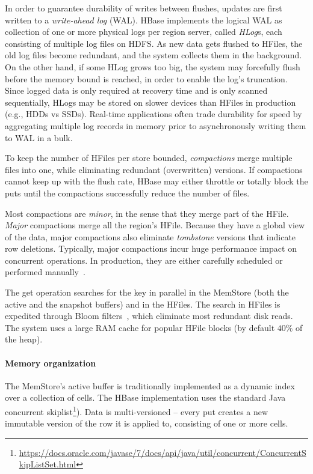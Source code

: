 In order to guarantee durability of writes between flushes, updates are first written to 
a \emph{write-ahead log} (WAL). HBase implements the logical WAL as collection of one or more physical 
logs per region server, called \emph{HLog}s, each consisting of multiple log files on HDFS. 
As new data gets flushed to HFiles, the old log files become redundant, and the system collects 
them in the background. On the other hand, if some HLog grows too big, the system may forcefully
flush before the memory bound is reached, in order to enable the log's truncation. 
Since logged data is only required at recovery time and is only scanned sequentially, HLogs
may be stored on slower devices than HFiles in production (e.g., HDDs vs SSDs). 
Real-time applications often trade durability for speed by aggregating multiple log records 
in memory prior to asynchronously writing them to WAL in a bulk. 

To keep the number of HFiles per store bounded, \emph{compactions} merge multiple files 
into one, while eliminating redundant (overwritten) versions. If compactions cannot keep up
with the flush rate, HBase may either throttle or totally block the puts until the compactions 
successfully reduce the number of files. 

Most compactions are \emph{minor}, 
in the sense that they merge part of the HFile. \emph{Major} compactions merge all the region's 
HFile. Because they have a global view of the data, major compactions also eliminate 
{\em tombstone} versions that indicate row deletions. Typically, major compactions incur huge 
performance impact on concurrent operations. In production, they are either carefully scheduled 
or performed manually~\cite{hbasetuning}.

The get operation searches for the key in parallel in the MemStore (both the active and the 
snapshot buffers) and in the HFiles. The search in HFiles is expedited through Bloom 
filters~\cite{Chang2008}, which eliminate most redundant disk reads. The system 
uses a large RAM cache for popular HFile blocks (by default $40\%$ of the heap).

\paragraph{Memory organization}
The MemStore's active buffer is traditionally implemented as a dynamic index over a collection of cells.  
The HBase implementation uses the standard Java concurrent skiplist\footnote{\small{\url{https://docs.oracle.com/javase/7/docs/api/java/util/concurrent/ConcurrentSkipListSet.html}}}).
Data is multi-versioned -- every put creates a new immutable version of the row it is applied to, 
consisting of one or more cells. 

